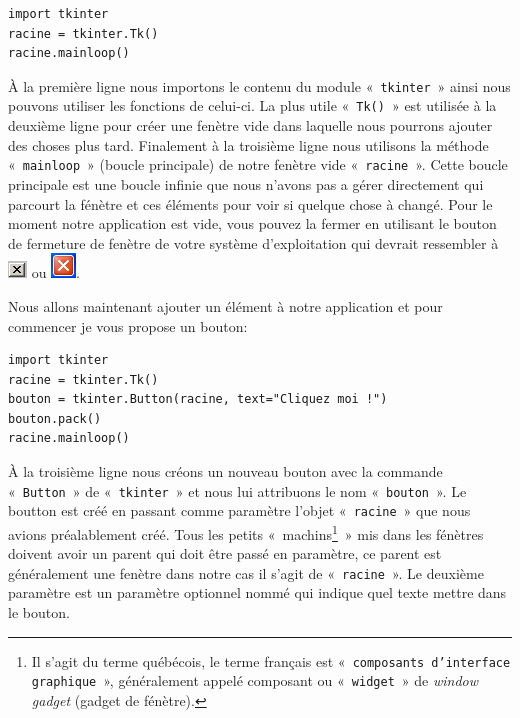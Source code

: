 \begin{Verbatim}[frame=single,rulecolor=\color{mbleu}, label=à taper et sauver dans un nouveau fichier .py]
import tkinter
racine = tkinter.Tk()
racine.mainloop()
\end{Verbatim}

À la première ligne nous importons le contenu du module «~\texttt{tkinter}~» ainsi nous pouvons utiliser les fonctions de celui-ci. La plus utile «~\texttt{Tk()}~»  est utilisée à la deuxième ligne pour créer une fenètre vide dans laquelle nous pourrons ajouter des choses plus tard. Finalement à la troisième ligne nous utilisons la méthode «~\texttt{mainloop}~» (boucle principale) de notre fenètre vide «~\texttt{racine}~». Cette boucle principale est une boucle infinie que nous n'avons pas a gérer directement qui parcourt la fénètre et ces éléments pour voir si quelque chose à changé. Pour le moment notre application est vide, vous pouvez la fermer en utilisant le bouton de fermeture de fenètre de votre système d'exploitation qui devrait ressembler à  \includegraphics[scale=1]{images/fermer} ou \includegraphics[scale=1]{images/fermer2}.

Nous allons maintenant ajouter un élément à notre application et pour commencer je vous propose un bouton:
\begin{Verbatim}[frame=single,rulecolor=\color{mbleu}, label=à taper et sauver dans un nouveau fichier .py]
import tkinter
racine = tkinter.Tk()
bouton = tkinter.Button(racine, text="Cliquez moi !")
bouton.pack()
racine.mainloop()
\end{Verbatim}

À la troisième ligne nous créons un nouveau bouton avec la commande «~\texttt{Button}~» de «~\texttt{tkinter}~» et nous lui attribuons le nom «~\texttt{bouton}~». Le boutton est créé en passant comme paramètre l'objet «~\texttt{racine}~»  que nous avions préalablement créé. Tous les petits «~machins\footnote{Il s'agit du terme québécois, le terme français est «~\texttt{composants d'interface graphique}~», généralement appelé composant ou  «~\texttt{widget}~»  de \emph{window gadget} (gadget de fénètre).}~» mis dans les fénètres doivent avoir un parent qui doit être passé en paramètre, ce parent est généralement une fenètre dans notre cas il s'agit de «~\texttt{racine}~». Le deuxième paramètre est un paramètre optionnel nommé qui indique quel texte mettre dans le bouton.

